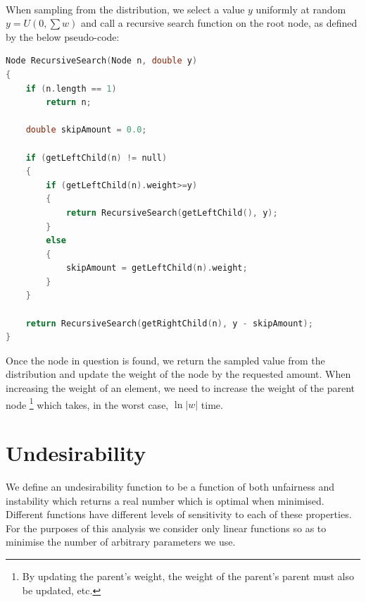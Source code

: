\documentclass{article}
\begin{document}
\paragraph{}
When sampling from the distribution, we select a value $y$ uniformly at random $y=U(0,\sum w)$ and call a recursive search function on the root node, as defined by the below pseudo-code:

\begin{lstlisting}[language=C++]
Node RecursiveSearch(Node n, double y)
{
	if (n.length == 1)
		return n;
	
	double skipAmount = 0.0;
	
	if (getLeftChild(n) != null)
	{
		if (getLeftChild(n).weight>=y)
		{
			return RecursiveSearch(getLeftChild(), y);
		}
		else
		{
			skipAmount = getLeftChild(n).weight;
		}
	}
	
	return RecursiveSearch(getRightChild(n), y - skipAmount);
}
\end{lstlisting}

Once the node in question is found, we return the sampled value from the distribution and update the weight of the node by the requested amount. When increasing the weight of an element, we need to increase the weight of the parent node \footnote{By updating the parent's weight, the weight of the parent's parent must also be updated, etc.} which takes, in the worst case, $\ln |w|$ time.

\section{Undesirability}
\label{sec:undesirability}

We define an undesirability function to be a function of both unfairness and instability which returns a real number which is optimal when minimised. Different functions have different levels of sensitivity to each of these properties. For the purposes of this analysis we consider only linear functions so as to minimise the number of arbitrary parameters we use.
\end{document}
